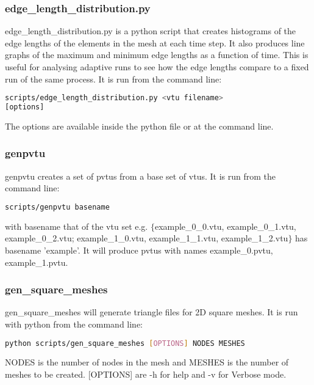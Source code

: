 
\subsubsection{edge\_length\_distribution.py}
\label{sect:edgelengthdist}

edge\_length\_distribution.py is a python script that creates histograms of the edge lengths of the elements in the mesh at each time step. It also produces line graphs of the maximum and minimum edge lengths as a function of time. This is useful for analysing adaptive runs to see how the edge lengths compare to a fixed run of the same process.  It is run from the command line:
\begin{lstlisting}[language = Bash]
scripts/edge_length_distribution.py <vtu filename> 
[options]
\end{lstlisting}
The options are available inside the python file or at the command line.


\subsubsection{genpvtu}
\label{sect:genpvtu}
genpvtu creates a set of pvtus from a base set of vtus. It is run from the command line:
\begin{lstlisting}[language = Bash]
scripts/genpvtu basename 
\end{lstlisting}
with basename that of the vtu set e.g. $\{$example\_0\_0.vtu, example\_0\_1.vtu, example\_0\_2.vtu; example\_1\_0.vtu, example\_1\_1.vtu, example\_1\_2.vtu$\}$ has basename 'example'. It will produce pvtus with names example\_0.pvtu, example\_1.pvtu.


\subsubsection{gen\_square\_meshes}
\label{sect:gen_square_meshes}
gen\_square\_meshes will generate triangle files for 2D square meshes. It is run with python from the command line:
\begin{lstlisting}[language = Bash]
python scripts/gen_square_meshes [OPTIONS] NODES MESHES 
\end{lstlisting} 
NODES is the number of nodes in the mesh and MESHES is the number of meshes to be created. [OPTIONS] are -h for help and -v for Verbose mode.


